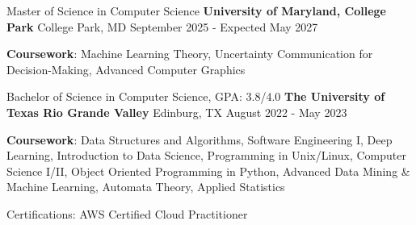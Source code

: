 
\begin{cventries}
  \cventry
    {Master of Science in Computer Science} %
    {\textbf{University of Maryland, College Park}} %
    {College Park, MD} %
    {September 2025 - Expected May 2027} %
    {
      \begin{cvitems} %
         \item {\textbf{Coursework}: Machine Learning Theory, Uncertainty Communication for Decision-Making, Advanced Computer Graphics}
      \end{cvitems}
      \dotfill
    }

  \cventry
    {Bachelor of Science in Computer Science, GPA: 3.8/4.0} %
    {\textbf{The University of Texas Rio Grande Valley}} %
    {Edinburg, TX} %
    {August 2022 - May 2023} %
    {
      \begin{cvitems} %
         \item {\textbf{Coursework}: Data Structures and Algorithms, Software Engineering I, Deep Learning, Introduction to Data Science, Programming in Unix/Linux, Computer Science I/II, Object Oriented Programming in Python, Advanced Data Mining \& Machine Learning, Automata Theory, Applied Statistics}
      \end{cvitems}
    }

\end{cventries}

\begin{cvawards}
  \cvaward
    {Certifications:} %
    {AWS Certified Cloud Practitioner } %

\end{cvawards}
